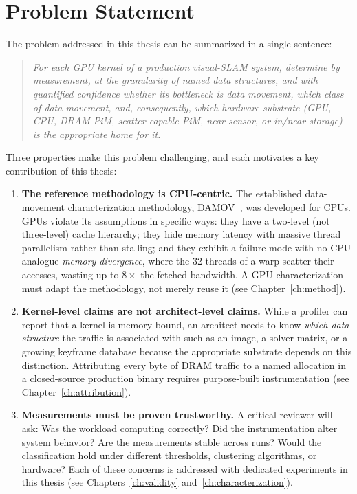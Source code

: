 \section{Problem Statement}
The problem addressed in this thesis can be summarized in a single sentence:
\begin{quote}
\emph{For each GPU kernel of a production visual-SLAM system, determine by measurement, at the granularity of named data structures, and with quantified confidence whether its bottleneck is data movement, which class of data movement, and, consequently, which hardware substrate (GPU, CPU, DRAM-PiM, scatter-capable PiM, near-sensor, or in/near-storage) is the appropriate home for it.}
\end{quote}

Three properties make this problem challenging, and each motivates a key contribution of this thesis:

\begin{enumerate}
\item \textbf{The reference methodology is CPU-centric.} The established data-movement characterization methodology, DAMOV~\cite{oliveira2021damov}, was developed for CPUs. GPUs violate its assumptions in specific ways: they have a two-level (not three-level) cache hierarchy; they hide memory latency with massive thread parallelism rather than stalling; and they exhibit a failure mode with no CPU analogue \emph{memory divergence}, where the 32 threads of a warp scatter their accesses, wasting up to $8\times$ the fetched bandwidth. A GPU characterization must adapt the methodology, not merely reuse it (see Chapter~\ref{ch:method}).
\item \textbf{Kernel-level claims are not architect-level claims.} While a profiler can report that a kernel is memory-bound, an architect needs to know \emph{which data structure} the traffic is associated with such as an image, a solver matrix, or a growing keyframe database because the appropriate substrate depends on this distinction. Attributing every byte of DRAM traffic to a named allocation in a closed-source production binary requires purpose-built instrumentation (see Chapter~\ref{ch:attribution}).
\item \textbf{Measurements must be proven trustworthy.} A critical reviewer will ask: Was the workload computing correctly? Did the instrumentation alter system behavior? Are the measurements stable across runs? Would the classification hold under different thresholds, clustering algorithms, or hardware? Each of these concerns is addressed with dedicated experiments in this thesis (see Chapters~\ref{ch:validity} and~\ref{ch:characterization}).\end{enumerate}

